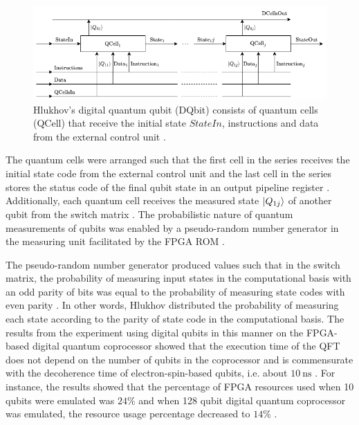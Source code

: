 \begin{figure}[!ht]
	\centering
	\includegraphics[width=1.0\linewidth]{body/ch3/figs/hlukhov-qubit}
	\caption[Digital Qubit (DQbit) by Hlukhov.]{Hlukhov's digital quantum qubit (DQbit) consists of quantum cells (QCell) that receive the initial state $StateIn$, instructions and data from the external control unit \cite{Hlukhov2021}.}
	\label{fig:hlukhov-qubit}
\end{figure}

The quantum cells were arranged such that the first cell in the series receives the initial state code from the external control unit and the last cell in the series stores the status code of the final qubit state in an output pipeline register \cite{Hlukhov2021}. Additionally, each quantum cell receives the measured state $\ket{Q_{1j}}$ of another qubit from the switch matrix \cite{Hlukhov2021}. The probabilistic nature of quantum measurements of qubits was enabled by a pseudo-random number generator in the measuring unit facilitated by the FPGA ROM \cite{Hlukhov2021}. 

The pseudo-random number generator produced values such that in the switch matrix, the probability of measuring input states in the computational basis with an odd parity of bits was equal to the probability of measuring state codes with even parity \cite{Hlukhov2021}. In other words, Hlukhov distributed the probability of measuring each state according to the parity of state code in the computational basis. The results from the experiment using digital qubits in this manner on the FPGA-based digital quantum coprocessor showed that the execution time of the QFT does not depend on the number of qubits in the coprocessor and is commensurate with the decoherence time of electron-spin-based qubits, i.e. about $\SI{10}{\nano\second}$ \cite{Hlukhov2021}. For instance, the results showed that the percentage of FPGA resources used when 10 qubits were emulated was $24\%$ and when 128 qubit digital quantum coprocessor was emulated, the resource usage percentage decreased to $14\%$ \cite{Hlukhov2021}.

